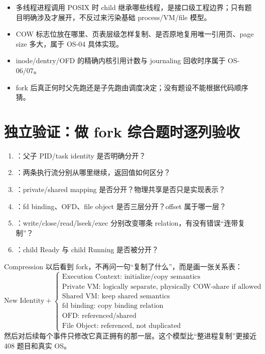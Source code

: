 \documentclass[UTF8,fontset=none,11pt,a4paper]{ctexart}
\begin{document}
\begin{itemize}
  \item 多线程进程调用 POSIX  时 child 继承哪些线程，是接口级工程边界；只有题目明确涉及才展开，不反过来污染基础 process/VM/file 模型。
  \item COW 标志位放在哪里、页表层级怎样复制、是否原地复用唯一引用页、page size 多大，属于 OS-04 具体实现。
  \item inode/dentry/OFD 的精确内核引用计数与 journaling 回收时序属于 OS-06/07。
  \item fork 后真正何时父先跑还是子先跑由调度决定；没有题设不能根据代码顺序猜。
\end{itemize}

\section{独立验证：做 fork 综合题时逐列验收}

\begin{enumerate}
  \item {}：父子 PID/task identity 是否明确分开？
  \item {}：两条执行流分别从哪里继续，返回值如何区分？
  \item {}：private/shared mapping 是否分开？物理共享是否只是实现表示？
  \item {}：fd binding、OFD、file object 是否三层分开？offset 属于哪一层？
  \item {}：write/close/read/lseek/exec 分别改变哪条 relation，有没有错误“连带复制”？
  \item {}：child Ready 与 child Running 是否被分开？
\end{enumerate}

\begin{corebox}{Compression}
以后看到 fork，不再问一句“复制了什么”，而是画一张关系表：
\[
\boxed{
\text{New Identity}
+
\begin{cases}
\text{Execution Context: initialize/copy semantics}\\
\text{Private VM: logically separate, physically COW-share if allowed}\\
\text{Shared VM: keep shared semantics}\\
\text{fd binding: copy binding relation}\\
\text{OFD: referenced/shared}\\
\text{File Object: referenced, not duplicated}
\end{cases}
}
\]
然后对后续每个事件只修改它真正拥有的那一层。这个模型比“整进程复制”更接近 408 题目和真实 OS。
\end{corebox}
\end{document}

